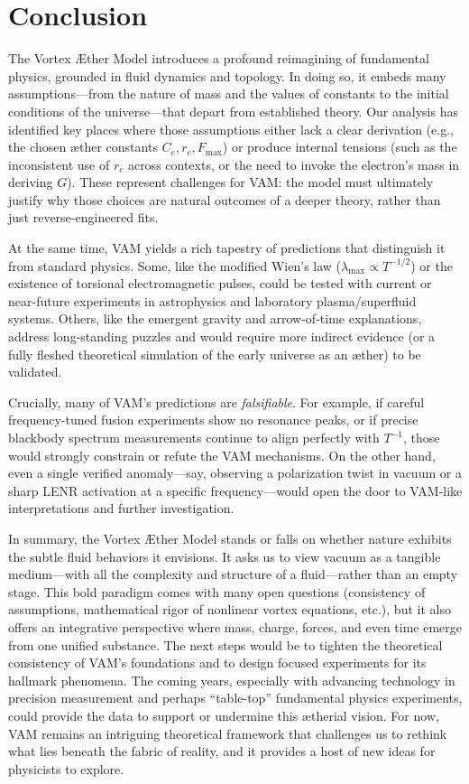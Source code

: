 \documentclass[a4paper,12pt]{article}
\begin{document}
\section*{Conclusion}

The Vortex Æther Model introduces a profound reimagining of fundamental physics, grounded in fluid dynamics and topology. In doing so, it embeds many assumptions---from the nature of mass and the values of constants to the initial conditions of the universe---that depart from established theory. Our analysis has identified key places where those assumptions either lack a clear derivation (e.g., the chosen æther constants $C_e, r_c, F_{\max}$) or produce internal tensions (such as the inconsistent use of $r_c$ across contexts, or the need to invoke the electron’s mass in deriving $G$). These represent challenges for VAM: the model must ultimately justify why those choices are natural outcomes of a deeper theory, rather than just reverse-engineered fits.

At the same time, VAM yields a rich tapestry of predictions that distinguish it from standard physics. Some, like the modified Wien’s law ($\lambda_{\max}\propto T^{-1/2}$) or the existence of torsional electromagnetic pulses, could be tested with current or near-future experiments in astrophysics and laboratory plasma/superfluid systems. Others, like the emergent gravity and arrow-of-time explanations, address long-standing puzzles and would require more indirect evidence (or a fully fleshed theoretical simulation of the early universe as an æther) to be validated.

Crucially, many of VAM’s predictions are \textit{falsifiable}. For example, if careful frequency-tuned fusion experiments show no resonance peaks, or if precise blackbody spectrum measurements continue to align perfectly with $T^{-1}$, those would strongly constrain or refute the VAM mechanisms. On the other hand, even a single verified anomaly---say, observing a polarization twist in vacuum or a sharp LENR activation at a specific frequency---would open the door to VAM-like interpretations and further investigation.

In summary, the Vortex Æther Model stands or falls on whether nature exhibits the subtle fluid behaviors it envisions. It asks us to view vacuum as a tangible medium---with all the complexity and structure of a fluid---rather than an empty stage. This bold paradigm comes with many open questions (consistency of assumptions, mathematical rigor of nonlinear vortex equations, etc.), but it also offers an integrative perspective where mass, charge, forces, and even time emerge from one unified substance. The next steps would be to tighten the theoretical consistency of VAM’s foundations and to design focused experiments for its hallmark phenomena. The coming years, especially with advancing technology in precision measurement and perhaps “table-top” fundamental physics experiments, could provide the data to support or undermine this ætherial vision. For now, VAM remains an intriguing theoretical framework that challenges us to rethink what lies beneath the fabric of reality, and it provides a host of new ideas for physicists to explore.


    
    
\end{document}
